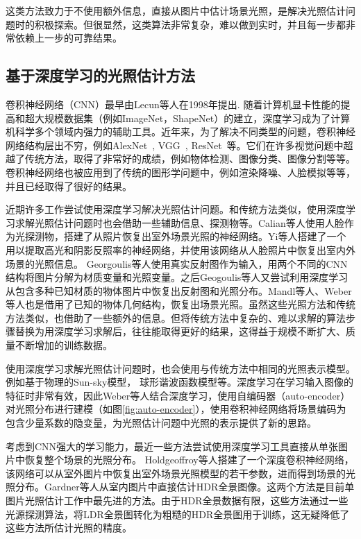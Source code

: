 这类方法致力于不使用额外信息，直接从图片中估计场景光照，是解决光照估计问题时的积极探索。但很显然，这类算法非常复杂，难以做到实时，并且每一步都非常依赖上一步的可靠结果。
\subsection{基于深度学习的光照估计方法}
卷积神经网络（CNN）最早由Lecun等人\cite{lecun1998gradient}在1998年提出. 随着计算机显卡性能的提高和超大规模数据集（例如ImageNet\cite{deng2009imagenet}，ShapeNet\cite{chang2015shapenet}）的建立，深度学习成为了计算机科学多个领域内强力的辅助工具。近年来，为了解决不同类型的问题，卷积神经网络结构层出不穷，例如AlexNet~\cite{krizhevsky2012imagenet}, VGG~\cite{simonyan2014very}, ResNet~\cite{he2016deep}等。它们在许多视觉问题中超越了传统方法，取得了非常好的成绩，例如物体检测\cite{girshick2014rich}、图像分类\cite{krizhevsky2012imagenet}、图像分割\cite{ronneberger2015u}等等。卷积神经网络也被应用到了传统的图形学问题中，例如渲染降噪\cite{chaitanya2017interactive}、人脸模拟\cite{karras2017audio}等等，并且已经取得了很好的结果。

近期许多工作尝试使用深度学习解决光照估计问题。和传统方法类似，使用深度学习求解光照估计问题时也会借助一些辅助信息、探测物等。Calian等人\cite{calian2018faces}使用人脸作为光探测物，搭建了从照片恢复出室外场景光照的神经网络。Yi等人\cite{yi2018faces}搭建了一个用以提取高光和阴影反照率的神经网络，并使用该网络从人脸照片中恢复出室内外场景的光照信息。
Georgoulis等人\cite{georgoulis2016delight}使用真实反射图作为输入，用两个不同的CNN结构将图片分解为材质变量和光照变量。之后Geogoulis等人\cite{georgoulis2016natural}又尝试利用深度学习从包含多种已知材质的物体图片中恢复出反射图和光照分布。Mandl等人\cite{mandl2017learning}、Weber等人\cite{weber2018learning}也是借用了已知的物体几何结构，恢复出场景光照。虽然这些光照方法和传统方法类似，也借助了一些额外的信息。但将传统方法中复杂的、难以求解的算法步骤替换为用深度学习求解后，往往能取得更好的结果，这得益于规模不断扩大、质量不断增加的训练数据。

使用深度学习求解光照估计问题时，也会使用与传统方法中相同的光照表示模型。例如基于物理的Sun-sky模型\cite{hold2017deep}， 球形谐波函数模型\cite{mandl2017learning}等。深度学习在学习输入图像的特征时非常有效，因此Weber等人\cite{weber2018learning}结合深度学习，使用自编码器（auto-encoder）对光照分布进行建模（如图\ref{fig:auto-encoder}），使用卷积神经网络将场景编码为包含少量系数的隐变量，为光照估计问题中光照的表示提供了新的思路。

考虑到CNN强大的学习能力，最近一些方法尝试使用深度学习工具直接从单张图片中恢复整个场景的光照分布。
Holdgeoffroy等人\cite{hold2017deep}搭建了一个深度卷积神经网络，该网络可以从室外图片中恢复出室外场景光照模型的若干参数，进而得到场景的光照分布。Gardner等人\cite{gardner2017learning}从室内图片中直接估计HDR全景图像。这两个方法是目前单图片光照估计工作中最先进的方法。由于HDR全景数据有限，这些方法通过一些光源探测算法，将LDR全景图转化为粗糙的HDR全景图用于训练，这无疑降低了这些方法所估计光照的精度。

